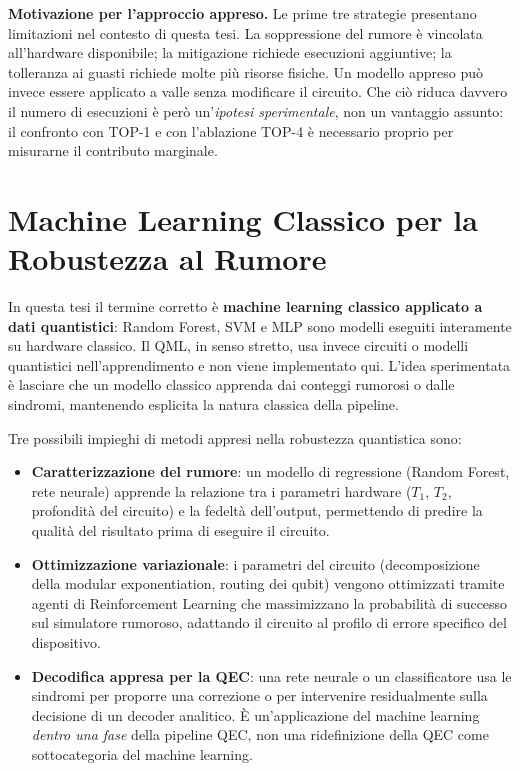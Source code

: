 \begin{onehalfspace}
\textbf{Motivazione per l'approccio appreso.} Le prime tre strategie presentano limitazioni nel contesto di questa tesi. La soppressione del rumore è vincolata all'hardware disponibile; la mitigazione richiede esecuzioni aggiuntive; la tolleranza ai guasti richiede molte più risorse fisiche. Un modello appreso può invece essere applicato a valle senza modificare il circuito. Che ciò riduca davvero il numero di esecuzioni è però un'\emph{ipotesi sperimentale}, non un vantaggio assunto: il confronto con TOP-1 e con l'ablazione TOP-4 è necessario proprio per misurarne il contributo marginale.

\section{Machine Learning Classico per la Robustezza al Rumore}
\label{sec:qml_overview}

In questa tesi il termine corretto è \textbf{machine learning classico applicato a dati quantistici}: Random Forest, \ac{SVM} e \ac{MLP} sono modelli eseguiti interamente su hardware classico. Il \ac{QML}, in senso stretto, usa invece circuiti o modelli quantistici nell'apprendimento e non viene implementato qui. L'idea sperimentata è lasciare che un modello classico apprenda dai conteggi rumorosi o dalle sindromi, mantenendo esplicita la natura classica della pipeline.

Tre possibili impieghi di metodi appresi nella robustezza quantistica sono:

\begin{itemize}
    \item \textbf{Caratterizzazione del rumore}: un modello di regressione (Random Forest, rete neurale) apprende la relazione tra i parametri hardware ($T_1$, $T_2$, profondità del circuito) e la fedeltà dell'output, permettendo di predire la qualità del risultato prima di eseguire il circuito.

    \item \textbf{Ottimizzazione variazionale}: i parametri del circuito (decomposizione della modular exponentiation, routing dei qubit) vengono ottimizzati tramite agenti di Reinforcement Learning che massimizzano la probabilità di successo sul simulatore rumoroso, adattando il circuito al profilo di errore specifico del dispositivo.

    \item \textbf{Decodifica appresa per la QEC}: una rete neurale o un classificatore usa le sindromi per proporre una correzione o per intervenire residualmente sulla decisione di un decoder analitico. È un'applicazione del machine learning \emph{dentro una fase} della pipeline QEC, non una ridefinizione della QEC come sottocategoria del machine learning.
\end{itemize}


\end{onehalfspace}
